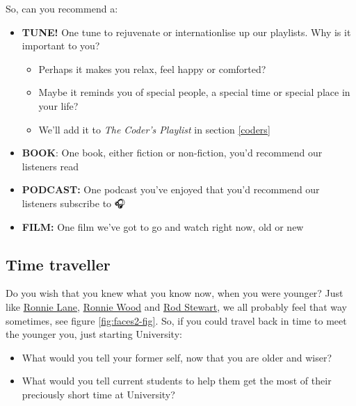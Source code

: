 \documentclass[
]{book}
\providecommand{\tightlist}{%
  \setlength{\itemsep}{0pt}\setlength{\parskip}{0pt}}
\begin{document}
So, can you recommend a:

\begin{itemize}
\tightlist
\item
  \textbf{TUNE!} One tune to rejuvenate or internationlise up our playlists. Why is it important to you?

  \begin{itemize}
  \tightlist
  \item
    Perhaps it makes you relax, feel happy or comforted?
  \item
    Maybe it reminds you of special people, a special time or special place in your life?
  \item
    We'll add it to \emph{The Coder's Playlist} in section \ref{coders}
  \end{itemize}
\item
  \textbf{BOOK}: One book, either fiction or non-fiction, you'd recommend our listeners read
\item
  \textbf{PODCAST:} One podcast you've enjoyed that you'd recommend our listeners subscribe to 🎧
\item
  \textbf{FILM:} One film we've got to go and watch right now, old or new 🍿
\end{itemize}

\hypertarget{your-time}{%
\subsection{Time traveller}\label{your-time}}

Do you wish that you knew what you know now, when you were younger? Just like \href{https://en.wikipedia.org/wiki/Ronnie_Lane}{Ronnie Lane}, \href{https://en.wikipedia.org/wiki/Ronnie_Wood}{Ronnie Wood} and \href{https://en.wikipedia.org/wiki/Rod_Stewart}{Rod Stewart}, we all probably feel that way sometimes, see figure \ref{fig:faces2-fig}. So, if you could travel back in time to meet the younger you, just starting University:

\begin{itemize}
\tightlist
\item
  What would you tell your former self, now that you are older and wiser?
\item
  What would you tell current students to help them get the most of their preciously short time at University?
\end{itemize}
\end{document}
